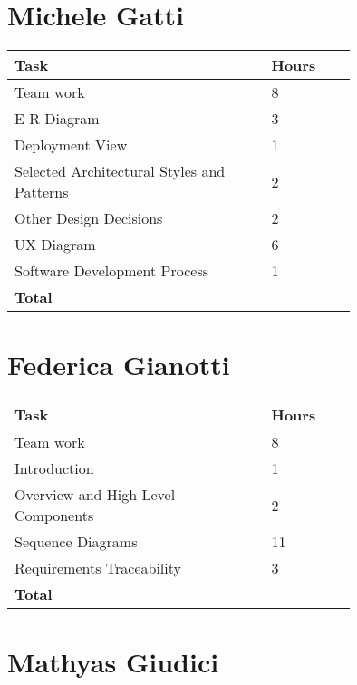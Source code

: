 \section{Michele Gatti}

\smallskip
\begin{center}
\begin{tabular}{ | p{0.75\linewidth} | l | }
  \hline
    \textbf{Task} & \textbf{Hours }\\ \hline
     Team work & 8 \\ \hline
     E-R Diagram & 3 \\ \hline
     Deployment View & 1 \\ \hline
     Selected Architectural Styles and Patterns & 2 \\ \hline
     Other Design Decisions & 2 \\ \hline
     UX Diagram & 6 \\ \hline
     Software Development Process & 1 \\ \hline
    \textbf{Total} & \textbf{} \\ \hline
\end{tabular}
\end{center}
\smallskip


\section{Federica Gianotti}

\smallskip
\begin{center}
\begin{tabular}{ | p{0.75\linewidth} | l | }
  \hline
    \textbf{Task} & \textbf{Hours }\\ \hline
    Team work & 8 \\ \hline
    Introduction & 1 \\ \hline
    Overview and High Level Components & 2 \\ \hline
    Sequence Diagrams & 11 \\ \hline
    Requirements Traceability & 3 \\ \hline
   \textbf{Total} & \textbf{} \\ \hline
\end{tabular}
\end{center}
\smallskip

\section{Mathyas Giudici}

